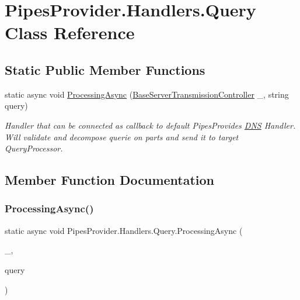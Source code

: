 \hypertarget{class_pipes_provider_1_1_handlers_1_1_query}{}\section{Pipes\+Provider.\+Handlers.\+Query Class Reference}
\label{class_pipes_provider_1_1_handlers_1_1_query}
\subsection*{Static Public Member Functions}
\begin{DoxyCompactItemize}
\item 
static async void \mbox{\hyperlink{class_pipes_provider_1_1_handlers_1_1_query_a3f08c44bfaf5e720d6dfbd791227c8fe}{Processing\+Async}} (\mbox{\hyperlink{class_pipes_provider_1_1_server_1_1_transmission_controllers_1_1_base_server_transmission_controller}{Base\+Server\+Transmission\+Controller}} \+\_\+, string query)
\begin{DoxyCompactList}\small\item\em Handler that can be connected as callback to default Pipes\+Provides \mbox{\hyperlink{class_pipes_provider_1_1_handlers_1_1_d_n_s}{D\+NS}} Handler. Will validate and decompose querie on parts and send it to target Query\+Processor. \end{DoxyCompactList}\end{DoxyCompactItemize}


\subsection{Member Function Documentation}
\mbox{\label{class_pipes_provider_1_1_handlers_1_1_query_a3f08c44bfaf5e720d6dfbd791227c8fe}} 
\subsubsection{\texorpdfstring{Processing\+Async()}{ProcessingAsync()}}
{\footnotesize\ttfamily static async void Pipes\+Provider.\+Handlers.\+Query.\+Processing\+Async (\begin{DoxyParamCaption}\item[{\mbox{\hyperlink{class_pipes_provider_1_1_server_1_1_transmission_controllers_1_1_base_server_transmission_controller}{Base\+Server\+Transmission\+Controller}}}]{\+\_\+,  }\item[{string}]{query }\end{DoxyParamCaption})\hspace{0.3cm}{\ttfamily [static]}}



